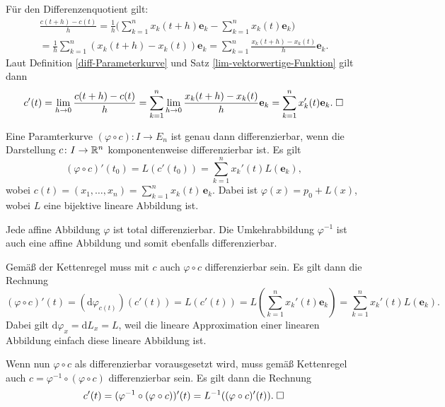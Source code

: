 \noindent{}
Für den Differenzenquotient gilt:
\begin{gather}
\frac{c(t+h)-c(t)}{h}
= \frac{1}{h}\bigg(\sum_{k=1}^n x_k(t+h)\mathbf e_k-\sum_{k=1}^n x_k(t)\mathbf e_k\bigg)\\
= \frac{1}{h}\sum_{k=1}^n (x_k(t+h)-x_k(t))\mathbf e_k
= \sum_{k=1}^n \frac{x_k(t+h)-x_k(t)}{h}\mathbf e_k.
\end{gather}
Laut Definition \ref{diff-Parameterkurve} und
Satz \ref{lim-vektorwertige-Funktion} gilt dann
\begin{equation}
c'(t) = \lim_{h\to 0}\frac{c(t+h)-c(t)}{h}
= \sum_{k=1}^n \lim_{h\to 0}\frac{x_k(t+h)-x_k(t)}{h}\mathbf e_k
= \sum_{k=1}^n x_k'(t)\mathbf e_k.\;\Box
\end{equation}

\begin{theorem}
Eine Paramterkurve $(\varphi\circ c)\colon I\to E_n$ ist genau dann
differenzierbar, wenn die Darstellung $c\colon I\to\mathbb R^n$
komponentenweise differenzierbar ist. Es gilt
\begin{equation}
(\varphi\circ c)'(t_0) = L(c'(t_0))
= \sum_{k=1}^n x_k'(t) L(\mathbf e_k),
\end{equation}
wobei $c(t) = (x_1,\ldots,x_n) = \sum_{k=1}^n x_k(t)\,\mathbf e_k$.
Dabei ist $\varphi(x) = p_0+L(x)$, wobei $L$ eine bijektive lineare
Abbildung ist.
\end{theorem}

\noindent{}
Jede affine Abbildung $\varphi$ ist total differenzierbar. Die
Umkehrabbildung $\varphi^{-1}$ ist auch eine affine Abbildung und
somit ebenfalls differenzierbar.

Gemäß der Kettenregel muss mit $c$ auch $\varphi\circ c$
differenzierbar sein. Es gilt dann die Rechnung%
\begin{equation}
(\varphi\circ c)'(t) = (\mathrm d\varphi_{c(t)})(c'(t))
= L(c'(t)) = L(\sum_{k=1}^n x_k'(t)\mathbf e_k)
= \sum_{k=1}^n x_k'(t)L(\mathbf e_k).
\end{equation}
Dabei gilt $\mathrm d\varphi_x = \mathrm dL_x = L$, weil die lineare
Approximation einer linearen Abbildung einfach diese lineare Abbildung
ist.

Wenn nun $\varphi\circ c$ als differenzierbar vorausgesetzt wird,
muss gemäß Kettenregel auch $c=\varphi^{-1}\circ(\varphi\circ c)$
differenzierbar sein. Es gilt dann die Rechnung
\begin{equation}
c'(t) = (\varphi^{-1}\circ(\varphi\circ c))'(t)
= L^{-1}((\varphi\circ c)'(t)).\;\Box
\end{equation}

